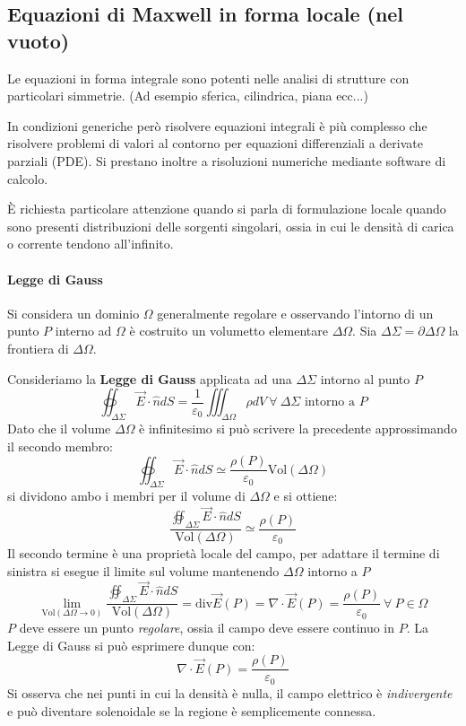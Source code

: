 \subsection{Equazioni di Maxwell in forma locale (nel vuoto)}
Le equazioni in forma integrale sono potenti nelle analisi di strutture con particolari simmetrie.
(Ad esempio sferica, cilindrica, piana ecc...)

In condizioni generiche però risolvere equazioni integrali è più complesso che risolvere problemi di 
valori al contorno per equazioni differenziali a derivate parziali (PDE).
Si prestano inoltre a risoluzioni numeriche mediante software di calcolo.

È richiesta particolare attenzione quando si parla di formulazione locale quando sono presenti
distribuzioni delle sorgenti singolari, ossia in cui le densità di carica o corrente tendono 
all'infinito.

\paragraph{Legge di Gauss}
Si considera un dominio $\Omega$ generalmente regolare e osservando l'intorno di
un punto $P$ interno ad $\Omega$ è costruito un volumetto elementare $\Delta\Omega$.
Sia $\Delta\Sigma = \partial\Delta\Omega$ la frontiera di $\Delta\Omega$.

Consideriamo la \textbf{Legge di Gauss} applicata ad una $\Delta\Sigma$ intorno al punto $P$
$$
\oiint_{\Delta\Sigma}\vec{E}\cdot\hat{n}dS = \frac{1}{\varepsilon_0} \iiint_{\Delta\Omega}\rho dV\ 
\forall\ \Delta\Sigma \text{ intorno a } P
$$
Dato che il volume $\Delta\Omega$ è infinitesimo si può scrivere la precedente approssimando il secondo
membro:
$$
\oiint_{\Delta\Sigma}\vec{E}\cdot\hat{n}dS \simeq \frac{\rho(P)}{\varepsilon_0}\text{Vol}(\Delta\Omega)
$$
si dividono ambo i membri per il volume di $\Delta\Omega$ e si ottiene:
$$
\frac{\oiint_{\Delta\Sigma}\vec{E}\cdot\hat{n}dS}{\text{Vol}(\Delta\Omega)} \simeq 
\frac{\rho(P)}{\varepsilon_0}
$$
Il secondo termine è una proprietà locale del campo, per adattare il termine di sinistra si esegue
il limite sul volume mantenendo $\Delta\Omega$ intorno a $P$
$$
\lim_{\text{Vol}(\Delta\Omega\to 0)} \frac{\oiint_{\Delta\Sigma}\vec{E}\cdot\hat{n}dS}{\text{Vol}(\Delta\Omega)} = \text{div}\vec{E}(P) = \nabla\cdot\vec{E}(P) = \frac{\rho(P)}{\varepsilon_0}\ \forall
\ P \in \Omega
$$
$P$ deve essere un punto \textit{regolare}, ossia il campo deve essere continuo in $P$.
La Legge di Gauss si può esprimere dunque con:
\begin{equation}
 \nabla\cdot\vec{E}(P) = \frac{\rho(P)}{\varepsilon_0}
 \label{eq:legge_gauss_locale}
\end{equation}
Si osserva che nei punti in cui la densità è nulla, il campo elettrico è \textit{indivergente} e
può diventare solenoidale se la regione è semplicemente connessa.

